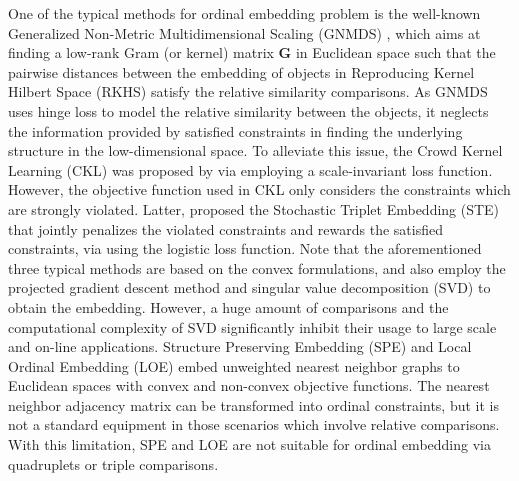 \documentclass[letterpaper]{article} %
\begin{document}
One of the typical methods for ordinal embedding problem is the well-known
Generalized Non-Metric Multidimensional Scaling (GNMDS) \cite{agarwal2007generalized}, which aims at finding a low-rank Gram (or kernel) matrix $\mathbf{G}$ in Euclidean space such that the pairwise distances between the embedding of objects in Reproducing Kernel Hilbert Space (RKHS) satisfy the relative similarity comparisons. As GNMDS uses hinge loss to model the relative similarity between the objects, it neglects the information provided by satisfied constraints in finding the underlying structure in the low-dimensional space. To alleviate this issue, the Crowd Kernel Learning (CKL) was proposed by \cite{tamuz2011adaptiive} via employing a scale-invariant loss function. However,
the objective function used in CKL
only considers the constraints which are strongly violated.
Latter, \cite{vandermaaten2012stochastic} proposed the Stochastic Triplet Embedding (STE) that jointly penalizes the violated constraints and rewards the satisfied constraints, via using the logistic loss function. Note that the aforementioned three typical methods are based on the convex formulations, and also employ the projected gradient descent method and singular value decomposition (SVD) to obtain the embedding.
However, a huge amount of comparisons and the computational complexity of SVD significantly inhibit their usage to large scale and on-line applications. Structure Preserving Embedding (SPE) \cite{Shaw:2009:SPE:1553374.1553494} and Local Ordinal Embedding (LOE) \cite{Terada2014LocalOE} embed unweighted nearest neighbor graphs to Euclidean spaces with convex and non-convex objective functions. The nearest neighbor adjacency matrix can be transformed into ordinal constraints, but it is not a standard equipment in those scenarios which involve relative comparisons. With this limitation, SPE and LOE are not suitable for ordinal embedding via quadruplets or triple comparisons.
	
\end{document}
